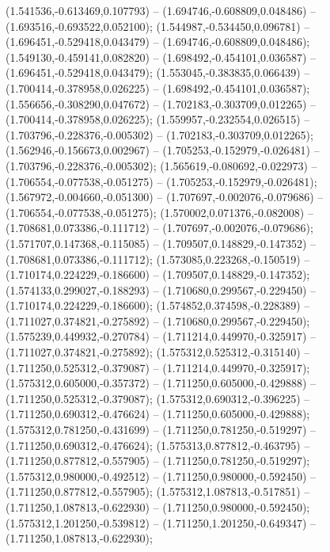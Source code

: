  (1.541536,-0.613469,0.107793) -- (1.694746,-0.608809,0.048486) -- (1.693516,-0.693522,0.052100);
 (1.544987,-0.534450,0.096781) -- (1.696451,-0.529418,0.043479) -- (1.694746,-0.608809,0.048486);
 (1.549130,-0.459141,0.082820) -- (1.698492,-0.454101,0.036587) -- (1.696451,-0.529418,0.043479);
 (1.553045,-0.383835,0.066439) -- (1.700414,-0.378958,0.026225) -- (1.698492,-0.454101,0.036587);
 (1.556656,-0.308290,0.047672) -- (1.702183,-0.303709,0.012265) -- (1.700414,-0.378958,0.026225);
 (1.559957,-0.232554,0.026515) -- (1.703796,-0.228376,-0.005302) -- (1.702183,-0.303709,0.012265);
 (1.562946,-0.156673,0.002967) -- (1.705253,-0.152979,-0.026481) -- (1.703796,-0.228376,-0.005302);
 (1.565619,-0.080692,-0.022973) -- (1.706554,-0.077538,-0.051275) -- (1.705253,-0.152979,-0.026481);
 (1.567972,-0.004660,-0.051300) -- (1.707697,-0.002076,-0.079686) -- (1.706554,-0.077538,-0.051275);
 (1.570002,0.071376,-0.082008) -- (1.708681,0.073386,-0.111712) -- (1.707697,-0.002076,-0.079686);
 (1.571707,0.147368,-0.115085) -- (1.709507,0.148829,-0.147352) -- (1.708681,0.073386,-0.111712);
 (1.573085,0.223268,-0.150519) -- (1.710174,0.224229,-0.186600) -- (1.709507,0.148829,-0.147352);
 (1.574133,0.299027,-0.188293) -- (1.710680,0.299567,-0.229450) -- (1.710174,0.224229,-0.186600);
 (1.574852,0.374598,-0.228389) -- (1.711027,0.374821,-0.275892) -- (1.710680,0.299567,-0.229450);
 (1.575239,0.449932,-0.270784) -- (1.711214,0.449970,-0.325917) -- (1.711027,0.374821,-0.275892);
 (1.575312,0.525312,-0.315140) -- (1.711250,0.525312,-0.379087) -- (1.711214,0.449970,-0.325917);
 (1.575312,0.605000,-0.357372) -- (1.711250,0.605000,-0.429888) -- (1.711250,0.525312,-0.379087);
 (1.575312,0.690312,-0.396225) -- (1.711250,0.690312,-0.476624) -- (1.711250,0.605000,-0.429888);
 (1.575312,0.781250,-0.431699) -- (1.711250,0.781250,-0.519297) -- (1.711250,0.690312,-0.476624);
 (1.575313,0.877812,-0.463795) -- (1.711250,0.877812,-0.557905) -- (1.711250,0.781250,-0.519297);
 (1.575312,0.980000,-0.492512) -- (1.711250,0.980000,-0.592450) -- (1.711250,0.877812,-0.557905);
 (1.575312,1.087813,-0.517851) -- (1.711250,1.087813,-0.622930) -- (1.711250,0.980000,-0.592450);
 (1.575312,1.201250,-0.539812) -- (1.711250,1.201250,-0.649347) -- (1.711250,1.087813,-0.622930);
